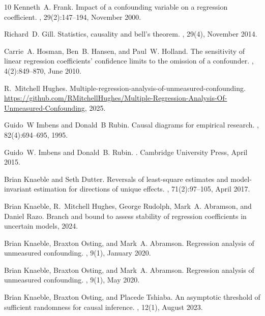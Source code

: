 \documentclass[11pt]{amsart}
\begin{document}
\begin{thebibliography}{10}
Kenneth~A. Frank.
\newblock Impact of a confounding variable on a regression coefficient.
, 29(2):147--194, November 2000.

Richard~D. Gill.
\newblock Statistics, causality and bell's theorem.
, 29(4), November 2014.

Carrie~A. Hosman, Ben~B. Hansen, and Paul~W. Holland.
\newblock The sensitivity of linear regression coefficients' confidence limits to the omission of a confounder.
, 4(2):849--870, June 2010.

R.~Mitchell Hughes.
\newblock Multiple-regression-analysis-of-unmeasured-confounding.
\newblock \url{https://github.com/RMitchellHughes/Multiple-Regression-Analysis-Of-Unmeasured-Confounding}, 2025.

Guido~W Imbens and Donald~B Rubin.
\newblock Causal diagrams for empirical research.
, 82(4):694--695, 1995.

Guido~W. Imbens and Donald~B. Rubin.
.
\newblock Cambridge University Press, April 2015.

Brian Knaeble and Seth Dutter.
\newblock Reversals of least-square estimates and model-invariant estimation for directions of unique effects.
, 71(2):97--105, April 2017.

Brian Knaeble, R.~Mitchell Hughes, George Rudolph, Mark~A. Abramson, and Daniel Razo.
\newblock Branch and bound to assess stability of regression coefficients in uncertain models, 2024.

Brian Knaeble, Braxton Osting, and Mark~A. Abramson.
\newblock Regression analysis of unmeasured confounding.
, 9(1), January 2020.

Brian Knaeble, Braxton Osting, and Mark~A. Abramson.
\newblock Regression analysis of unmeasured confounding.
, 9(1), May 2020.

Brian Knaeble, Braxton Osting, and Placede Tshiaba.
\newblock An asymptotic threshold of sufficient randomness for causal inference.
, 12(1), August 2023.


\end{thebibliography}
\end{document}

